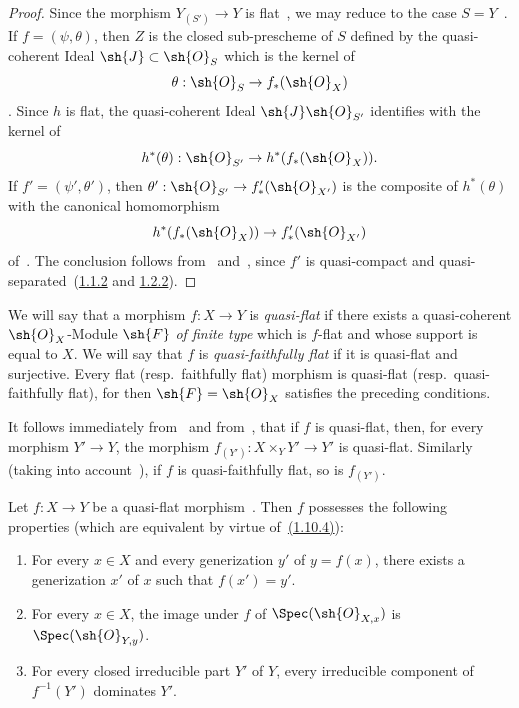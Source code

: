 \begin{proof}
Since the morphism $Y_{(S')}\to Y$ is flat~, we may reduce to the case $S=Y$~.
If $f=(\psi,\theta)$, then $Z$ is the closed sub-prescheme of $S$ defined by the quasi-coherent Ideal $\sh{J}\subset\sh{O}_S$ which is the kernel of
\[
  \theta:\sh{O}_S\to f_*(\sh{O}_X)
\]
.
Since $h$ is flat, the quasi-coherent Ideal $\sh{J}\sh{O}_{S'}$ identifies with the kernel of
\[
  h^*(\theta):\sh{O}_{S'}\to h^*(f_*(\sh{O}_X)).
\]
If $f'=(\psi',\theta')$, then $\theta':\sh{O}_{S'}\to f'_*(\sh{O}_{X'})$ is the composite of $h^*(\theta)$ with the canonical homomorphism
\[
  h^*(f_*(\sh{O}_X))\to f'_*(\sh{O}_{X'})
\]
of~.
The conclusion follows from~ and~, since $f'$ is quasi-compact and quasi-separated~({\hyperlink{ega4.c04.prop.1-1-2}{1.1.2}} and {\hyperlink{ega4.c04.prop.1-2-2}{1.2.2}}).
\end{proof}

\begin{env}[2.3.3]
\label{IV.2.3.3}
We will say that a morphism $f:X\to Y$ is \emph{quasi-flat} if there exists a quasi-coherent $\sh{O}_X$-Module $\sh{F}$ \emph{of finite type} which is $f$-flat and whose support is equal to $X$.
We will say that $f$ is \emph{quasi-faithfully flat} if it is quasi-flat and surjective.
Every flat (resp.\ faithfully flat) morphism is quasi-flat (resp.\ quasi-faithfully flat), for then $\sh{F}=\sh{O}_X$ satisfies the preceding conditions.
\end{env}

It follows immediately from~ and from~, that if $f$ is quasi-flat, then, for every morphism $Y'\to Y$, the morphism $f_{(Y')}:X\times_Y Y'\to Y'$ is quasi-flat.
Similarly (taking into account~), if $f$ is quasi-faithfully flat, so is $f_{(Y')}$.

\begin{proposition}[2.3.4]
\label{IV.2.3.4}
Let $f:X\to Y$ be a quasi-flat morphism~. Then $f$ possesses the following properties \textnormal{(}which are equivalent by virtue of~{\hyperlink{ega4.c04.cor.1-10-4}{(1.10.4)}}\textnormal{)}:
\begin{enumerate}
  \item[(i)] For every $x\in X$ and every generization $y'$ of $y=f(x)$, there exists a generization $x'$ of $x$ such that $f(x')=y'$.
  \item[(ii)] For every $x\in X$, the image under $f$ of $\Spec(\sh{O}_{X,x})$ is $\Spec(\sh{O}_{Y,y})$.
  \item[\emph{(iii)}] For every closed irreducible part $Y'$ of $Y$, every irreducible component of $f^{-1}(Y')$ dominates $Y'$.
\end{enumerate}
\end{proposition}

